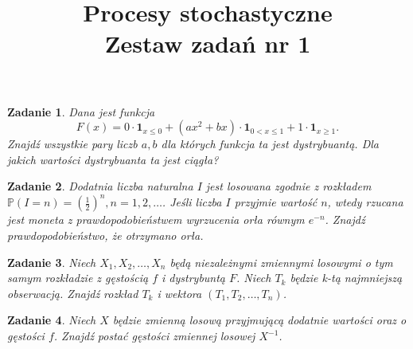 \documentclass{mwart}
\title{Procesy stochastyczne\\ Zestaw zadań nr 1}
\newtheorem{zd}{Zadanie}
\begin{document}

\maketitle
\begin{zd}
Dana jest funkcja
\begin{displaymath}
F(x) = 0\cdot\pmb{1}_{x\leq 0} + (ax^2+bx)\cdot\pmb{1}_{0<x\leq 1} + 1\cdot \pmb{1}_{x\geq 1}.
\end{displaymath}
Znajdź wszystkie pary liczb $a, b$ dla których funkcja ta jest dystrybuantą. Dla jakich wartości dystrybuanta ta jest ciągła?
\end{zd}

\begin{zd}
Dodatnia liczba naturalna $I$ jest losowana zgodnie z rozkładem $\mathbb{P}(I =n) = \left(\frac{1}{2}\right)^n, n = 1,2, \dots$. Jeśli liczba $I$ przyjmie wartość $n$, wtedy rzucana jest moneta z prawdopodobieństwem wyrzucenia orła równym $e^{-n}$. Znajdź prawdopodobieństwo, że otrzymano orła.
\end{zd}

\begin{zd}
Niech $X_1, X_2, \dots, X_n$ będą niezależnymi zmiennymi losowymi o tym samym rozkładzie z gęstością $f$ i dystrybuntą $F$. Niech $T_k$ będzie k-tą najmniejszą obserwacją. Znajdź rozkład $T_k$ i wektora $(T_1, T_2, \dots, T_n)$.
\end{zd}

\begin{zd}
Niech $X$ będzie zmienną losową przyjmującą dodatnie wartości oraz o gęstości $f$. Znajdź postać gęstości zmiennej losowej $X^{-1}$.
\end{zd}
\end{document}
